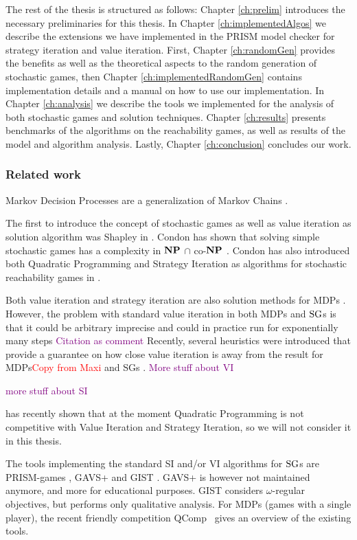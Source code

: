 The rest of the thesis is structured as follows:
Chapter \ref{ch:prelim} introduces the necessary preliminaries for this thesis.
In Chapter \ref{ch:implementedAlgos} we describe the extensions we have implemented in the PRISM model checker for strategy iteration and value iteration.
First, Chapter \ref{ch:randomGen} provides the benefits as well as the theoretical aspects to the random generation of stochastic games,
then Chapter \ref{ch:implementedRandomGen} contains implementation details and a manual on how to use our implementation.
In Chapter \ref{ch:analysis} we describe the tools we implemented for the analysis of both stochastic games and solution techniques.
Chapter \ref{ch:results} presents benchmarks of the algorithms on the reachability games, as well as results of the model and algorithm analysis.
Lastly, Chapter \ref{ch:conclusion} concludes our work.

\subsubsection*{Related work}
Markov Decision Processes are a generalization of Markov Chains \cite{Puterman} \cite[Ch.~11]{introProb}.

The first to introduce the concept of stochastic games as well as value iteration as solution algorithm was Shapley in \cite{shapley}.
Condon has shown that solving simple stochastic games has a complexity in $\mathbf{NP}$ $\cap$ co-$\mathbf{NP}$ \cite{condonComplexity}.
Condon has also introduced both Quadratic Programming and Strategy Iteration as algorithms for stochastic reachability games in \cite{condonQP}. 

Both value iteration and strategy iteration are also solution methods for MDPs \cite{Puterman}\cite{HoffmanKarp}.
However, the problem with standard value iteration in both MDPs and $\textrm{SG}$s is that it could be arbitrary imprecise \cite{haddadmonmege} and 
could in practice run for exponentially many steps \textcolor{purple}{Citation as comment}%
Recently, several heuristics were introduced that provide a guarantee on how close value iteration is away from the result for MDPs\textcolor{red}{Copy from Maxi} and SGs \cite{paperMaxi}.
\textcolor{purple}{More stuff about VI}

\textcolor{purple}{more stuff about SI}

\cite{gandalf} has recently shown that at the moment Quadratic Programming is not competitive with Value Iteration and Strategy Iteration,
so we will not consider it in this thesis.

The tools implementing the standard SI and/or VI algorithms for $\textrm{SG}$s are PRISM-games \cite{PRISM-games}, 
GAVS+ \cite{gavs+} and GIST \cite{chatterjee2010gist}.
GAVS+ is however not maintained anymore, and more for educational purposes.
GIST considers $\omega$-regular objectives, but performs only qualitative analysis. 
For MDPs (games with a single player), the recent friendly competition QComp~\cite{qcomp} gives an overview of the existing tools.